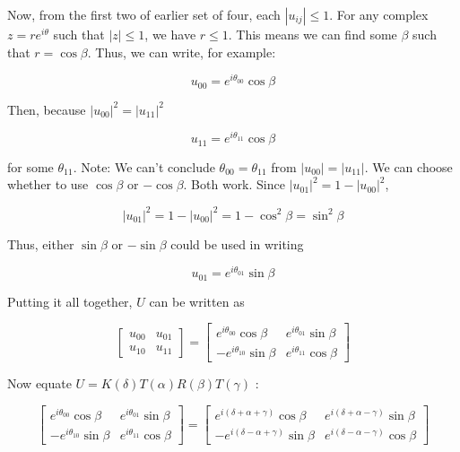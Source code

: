 \documentclass[main.tex]{subfiles}
\begin{document}
    Now, from the first two of earlier set of four, each $\left|u_{i j}\right| \leq 1$. For any complex $z=r e^{i \theta}$ such that $|z| \leq 1$, we have $r \leq 1$. This means we can find some $\beta$ such that $r=\cos \beta$. Thus, we can write, for example:
    
    $$
    u_{00}=e^{i \theta_{00}} \cos \beta
    $$
    
    Then, because $\left|u_{00}\right|^{2}=\left|u_{11}\right|^{2}$
    
    $$
    u_{11}=e^{i \theta_{11}} \cos \beta
    $$
    
    for some $\theta_{11}$. Note: We can't conclude $\theta_{00}=\theta_{11}$ from $\left|u_{00}\right|=\left|u_{11}\right|$. We can choose whether to use $\cos \beta$ or $-\cos \beta$. Both work. Since $\left|u_{01}\right|^{2}=1-\left|u_{00}\right|^{2}$,
    
    $$
    \left|u_{01}\right|^{2}=1-\left|u_{00}\right|^{2}=1-\cos ^{2} \beta=\sin ^{2} \beta
    $$
    
    Thus, either $\sin \beta$ or $-\sin \beta$ could be used in writing
    
    $$
    u_{01}=e^{i \theta_{01}} \sin \beta
    $$
    
    Putting it all together, $U$ can be written as
    
    $$
    \left[\begin{array}{ll}
    u_{00} & u_{01} \\
    u_{10} & u_{11}
    \end{array}\right]=\left[\begin{array}{cc}
    e^{i \theta_{00}} \cos \beta & e^{i \theta_{01}} \sin \beta \\
    -e^{i \theta_{10}} \sin \beta & e^{i \theta_{11}} \cos \beta
    \end{array}\right]
    $$
    
    Now equate $U=K(\delta) T(\alpha) R(\beta) T(\gamma)$ :
    
    $$
    \left[\begin{array}{cc}
    e^{i \theta_{00}} \cos \beta & e^{i \theta_{01}} \sin \beta \\
    -e^{i \theta_{10}} \sin \beta & e^{i \theta_{11}} \cos \beta
    \end{array}\right]=\left[\begin{array}{cc}
    e^{i(\delta+\alpha+\gamma)} \cos \beta & e^{i(\delta+\alpha-\gamma)} \sin \beta \\
    -e^{i(\delta-\alpha+\gamma)} \sin \beta & e^{i(\delta-\alpha-\gamma)} \cos \beta
    \end{array}\right]
    $$
    
\end{document}
